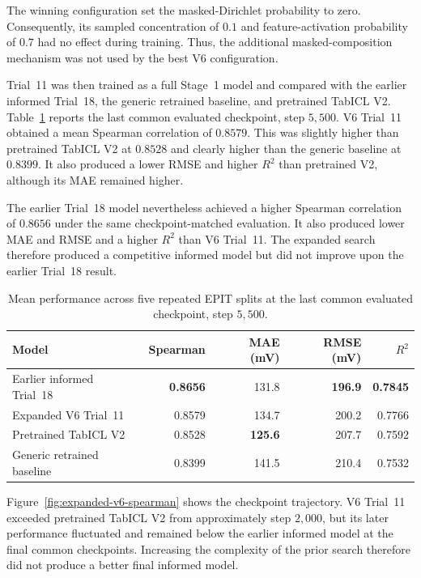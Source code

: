 \documentclass{article}
\begin{document}
The winning configuration set the masked-Dirichlet probability to zero. Consequently, its sampled concentration of \(0.1\) and feature-activation probability of \(0.7\) had no effect during training. Thus, the additional masked-composition mechanism was not used by the best V6 configuration.

Trial~11 was then trained as a full Stage~1 model and compared with the earlier informed Trial~18, the generic retrained baseline, and pretrained TabICL V2. Table~\ref{tab:expanded-v6-results} reports the last common evaluated checkpoint, step \(5{,}500\). V6 Trial~11 obtained a mean Spearman correlation of \(0.8579\). This was slightly higher than pretrained TabICL V2 at \(0.8528\) and clearly higher than the generic baseline at \(0.8399\). It also produced a lower RMSE and higher \(R^2\) than pretrained V2, although its MAE remained higher.

The earlier Trial~18 model nevertheless achieved a higher Spearman correlation of \(0.8656\) under the same checkpoint-matched evaluation. It also produced lower MAE and RMSE and a higher \(R^2\) than V6 Trial~11. The expanded search therefore produced a competitive informed model but did not improve upon the earlier Trial~18 result.

\begin{table}[htbp]
\centering
\caption{Mean performance across five repeated EPIT splits at the last common evaluated checkpoint, step \(5{,}500\).}
\label{tab:expanded-v6-results}
\begin{tabular}{lrrrr}
\hline
Model & Spearman & MAE (mV) & RMSE (mV) & \(R^2\) \\
\hline
Earlier informed Trial~18
    & \textbf{0.8656} & 131.8 & \textbf{196.9} & \textbf{0.7845} \\
Expanded V6 Trial~11
    & 0.8579 & 134.7 & 200.2 & 0.7766 \\
Pretrained TabICL V2
    & 0.8528 & \textbf{125.6} & 207.7 & 0.7592 \\
Generic retrained baseline
    & 0.8399 & 141.5 & 210.4 & 0.7532 \\
\hline
\end{tabular}
\end{table}

Figure~\ref{fig:expanded-v6-spearman} shows the checkpoint trajectory. V6 Trial~11 exceeded pretrained TabICL V2 from approximately step \(2{,}000\), but its later performance fluctuated and remained below the earlier informed model at the final common checkpoints. Increasing the complexity of the prior search therefore did not produce a better final informed model.
\end{document}
